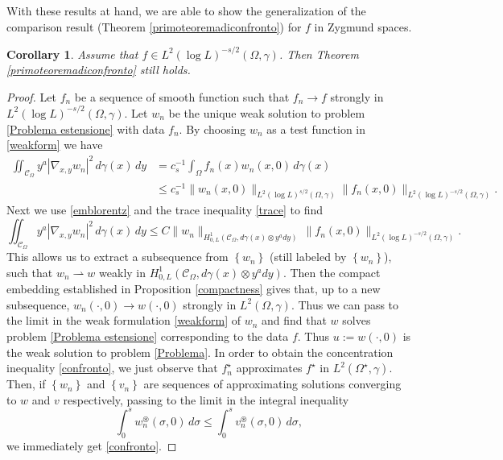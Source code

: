\documentclass[a4paper,10pt,reqno]{amsart}
\newtheorem{corollary}[theorem]{Corollary}
\numberwithin{equation}{section}
\begin{document}
With these results at hand, we are able to show the generalization of the comparison result (Theorem \ref{primoteoremadiconfronto}) for $f$ in Zygmund spaces.

\begin{corollary}
Assume that $f\in L^2(\log L)^{-s/2}(\Omega,\gamma)$. Then Theorem \ref{primoteoremadiconfronto} still holds.
\end{corollary}

\begin{proof}
Let $f_{n}$ be a sequence of smooth function such that $f_{n}\rightarrow f$ strongly in
$L^{2}(\log L)^{-s/2}(\Omega,\gamma)$. Let $w_{n}$ be the unique
weak solution to problem \eqref{Problema estensione} with data $f_{n}$. By choosing $w_{n}$ as a test function in \eqref{weakform} we have
\begin{align*}
\iint_{\mathcal{C}_{\Omega}} y^{a}|\nabla_{x,y}w_{n}|^{2}\,d\gamma(x)\,dy
&= c_{s}^{-1}\int_{\Omega}f_{n}(x)w_{n}(x,0)\,d\gamma(x) \\
&\leq c_{s}^{-1}\|w_{n}(x,0)\|_{L^{2}(\log
L)^{s/2}(\Omega,\gamma)}\|f_{n}(x,0)\|_{L^{2}(\log L)^{-s/2}(\Omega,\gamma)}.
\end{align*}
Next we use \eqref{emblorentz} and the trace inequality \eqref{trace} to find
\[
\iint_{\mathcal{C}_{\Omega}} y^{a} |\nabla_{x,y}w_{n}|^{2}\,d\gamma(x)\,dy\leq C\|w_{n}\|_{H_{0,L}^{1}(\mathcal{C}_{\Omega},d\gamma(x)\otimes
y^{a}dy)}\,\|f_{n}(x,0)\|_{L^{2}(\log L)^{-s/2}(\Omega,\gamma)}.
\]
This allows us to extract a subsequence from $\left\{w_{n}\right\}$ (still labeled by $\left\{w_{n}\right\}$), such that
$w_{n}\rightharpoonup w$ weakly in $H_{0,L}^{1}(\mathcal{C}_{\Omega},d\gamma(x)\otimes y^{a}dy)$.
Then the compact embedding established in Proposition \ref{compactness} gives that,
up to a new subsequence, $w_{n}(\cdot,0)\rightarrow w(\cdot,0)$ strongly in $L^{2}(\Omega,\gamma)$.
Thus we can pass to the limit in the weak formulation \eqref{weakform} of $w_{n}$ and find that $w$ solves problem \eqref{Problema estensione}
corresponding to the data $f$. Thus $u:=w(\cdot,0)$ is the weak solution to problem \eqref{Problema}. In order to obtain the concentration inequality
\eqref{confronto}, we just observe that $f_{n}^{\displaystyle\star}$ approximates $f^{\displaystyle\star}$ in $L^{2}(\Omega^{\displaystyle\star},\gamma)$.
Then, if $\left\{w_{n}\right\}$ and $\left\{v_{n}\right\}$ are sequences of approximating solutions converging to $w$ and $v$ respectively, passing to the limit in the integral inequality
\begin{equation*}
\int_{0}^{s}w_{n}^{\circledast}(\sigma,0)\,d\sigma\leq\int_{0}^{s}v_{n}^{\circledast
}(\sigma,0)\,d\sigma,
\end{equation*}
we immediately get \eqref{confronto}.
\end{proof}
\end{document}
